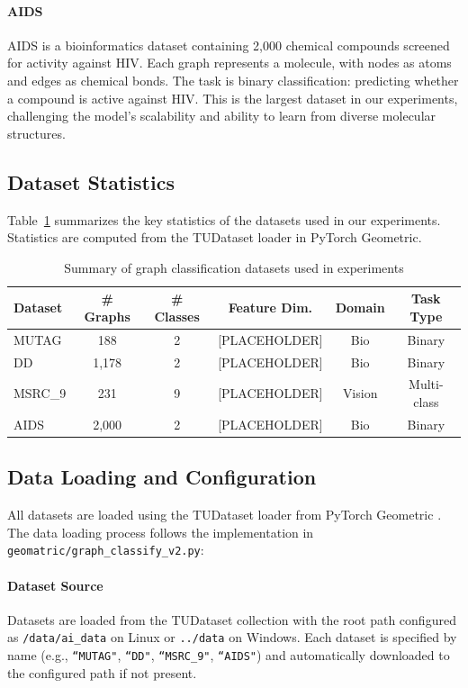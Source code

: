 \paragraph{AIDS}
AIDS is a bioinformatics dataset containing 2,000 chemical compounds screened for activity against HIV. Each graph represents a molecule, with nodes as atoms and edges as chemical bonds. The task is binary classification: predicting whether a compound is active against HIV. This is the largest dataset in our experiments, challenging the model's scalability and ability to learn from diverse molecular structures.

\subsection{Dataset Statistics}

Table~\ref{tab:datasets} summarizes the key statistics of the datasets used in our experiments. Statistics are computed from the TUDataset loader in PyTorch Geometric.

\begin{table}[t]
\centering
\caption{Summary of graph classification datasets used in experiments}
\label{tab:datasets}
\begin{tabular}{lccccc}
\toprule
Dataset & \# Graphs & \# Classes & Feature Dim. & Domain & Task Type \\
\midrule
MUTAG & 188 & 2 & [PLACEHOLDER] & Bio & Binary \\
DD & 1,178 & 2 & [PLACEHOLDER] & Bio & Binary \\
MSRC\_9 & 231 & 9 & [PLACEHOLDER] & Vision & Multi-class \\
AIDS & 2,000 & 2 & [PLACEHOLDER] & Bio & Binary \\
\bottomrule
\end{tabular}
\end{table}

\subsection{Data Loading and Configuration}

All datasets are loaded using the TUDataset loader from PyTorch Geometric \cite{fey2019fast}. The data loading process follows the implementation in \texttt{geomatric/graph\_classify\_v2.py}:

\paragraph{Dataset Source}
Datasets are loaded from the TUDataset collection with the root path configured as \texttt{/data/ai\_data} on Linux or \texttt{../data} on Windows. Each dataset is specified by name (e.g., \texttt{``MUTAG"}, \texttt{``DD"}, \texttt{``MSRC\_9"}, \texttt{``AIDS"}) and automatically downloaded to the configured path if not present.

